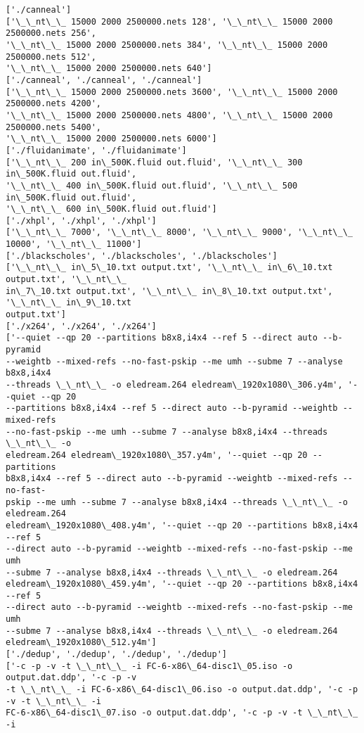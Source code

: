 \documentclass[11pt]{article}
\begin{document}
    \begin{Verbatim}[commandchars=\\\{\}]
['./canneal']
['\_\_nt\_\_ 15000 2000 2500000.nets 128', '\_\_nt\_\_ 15000 2000 2500000.nets 256',
'\_\_nt\_\_ 15000 2000 2500000.nets 384', '\_\_nt\_\_ 15000 2000 2500000.nets 512',
'\_\_nt\_\_ 15000 2000 2500000.nets 640']
['./canneal', './canneal', './canneal']
['\_\_nt\_\_ 15000 2000 2500000.nets 3600', '\_\_nt\_\_ 15000 2000 2500000.nets 4200',
'\_\_nt\_\_ 15000 2000 2500000.nets 4800', '\_\_nt\_\_ 15000 2000 2500000.nets 5400',
'\_\_nt\_\_ 15000 2000 2500000.nets 6000']
['./fluidanimate', './fluidanimate']
['\_\_nt\_\_ 200 in\_500K.fluid out.fluid', '\_\_nt\_\_ 300 in\_500K.fluid out.fluid',
'\_\_nt\_\_ 400 in\_500K.fluid out.fluid', '\_\_nt\_\_ 500 in\_500K.fluid out.fluid',
'\_\_nt\_\_ 600 in\_500K.fluid out.fluid']
['./xhpl', './xhpl', './xhpl']
['\_\_nt\_\_ 7000', '\_\_nt\_\_ 8000', '\_\_nt\_\_ 9000', '\_\_nt\_\_ 10000', '\_\_nt\_\_ 11000']
['./blackscholes', './blackscholes', './blackscholes']
['\_\_nt\_\_ in\_5\_10.txt output.txt', '\_\_nt\_\_ in\_6\_10.txt output.txt', '\_\_nt\_\_
in\_7\_10.txt output.txt', '\_\_nt\_\_ in\_8\_10.txt output.txt', '\_\_nt\_\_ in\_9\_10.txt
output.txt']
['./x264', './x264', './x264']
['--quiet --qp 20 --partitions b8x8,i4x4 --ref 5 --direct auto --b-pyramid
--weightb --mixed-refs --no-fast-pskip --me umh --subme 7 --analyse b8x8,i4x4
--threads \_\_nt\_\_ -o eledream.264 eledream\_1920x1080\_306.y4m', '--quiet --qp 20
--partitions b8x8,i4x4 --ref 5 --direct auto --b-pyramid --weightb --mixed-refs
--no-fast-pskip --me umh --subme 7 --analyse b8x8,i4x4 --threads \_\_nt\_\_ -o
eledream.264 eledream\_1920x1080\_357.y4m', '--quiet --qp 20 --partitions
b8x8,i4x4 --ref 5 --direct auto --b-pyramid --weightb --mixed-refs --no-fast-
pskip --me umh --subme 7 --analyse b8x8,i4x4 --threads \_\_nt\_\_ -o eledream.264
eledream\_1920x1080\_408.y4m', '--quiet --qp 20 --partitions b8x8,i4x4 --ref 5
--direct auto --b-pyramid --weightb --mixed-refs --no-fast-pskip --me umh
--subme 7 --analyse b8x8,i4x4 --threads \_\_nt\_\_ -o eledream.264
eledream\_1920x1080\_459.y4m', '--quiet --qp 20 --partitions b8x8,i4x4 --ref 5
--direct auto --b-pyramid --weightb --mixed-refs --no-fast-pskip --me umh
--subme 7 --analyse b8x8,i4x4 --threads \_\_nt\_\_ -o eledream.264
eledream\_1920x1080\_512.y4m']
['./dedup', './dedup', './dedup', './dedup']
['-c -p -v -t \_\_nt\_\_ -i FC-6-x86\_64-disc1\_05.iso -o output.dat.ddp', '-c -p -v
-t \_\_nt\_\_ -i FC-6-x86\_64-disc1\_06.iso -o output.dat.ddp', '-c -p -v -t \_\_nt\_\_ -i
FC-6-x86\_64-disc1\_07.iso -o output.dat.ddp', '-c -p -v -t \_\_nt\_\_ -i

\end{Verbatim}
\end{document}
